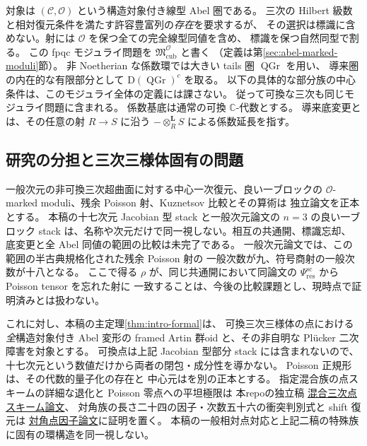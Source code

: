 \documentclass[11pt,a4paper]{ltjsarticle}
\numberwithin{equation}{section}
\newcommand{\C}{\mathbb C}
\begin{document}
対象は $(\mathcal C,\mathcal O)$ という構造対象付き線型 Abel 圏である。
三次の Hilbert 級数と相対復元条件を満たす許容豊富列の\emph{存在}を要求するが、
その選択は標識に含めない。射には $\mathcal O$ を保つ全ての完全線型同値を含め、
標識を保つ自然同型で割る。
この fpqc モジュライ問題を $\mathfrak M^{\mathcal O}_{\mathrm{cub}}$ と書く
（定義は第\ref{sec:abel-marked-moduli}節）。
非 Noetherian な係数環では大きい tails 圏 $\operatorname{QGr}$ を用い、
導来圏の内在的な有限部分として $\mathrm D(\operatorname{QGr})^c$ を取る。
以下の具体的な部分族の中心条件は、このモジュライ全体の定義には課さない。
従って可換な三次も同じモジュライ問題に含まれる。
係数基底は通常の可換 $\C$-代数とする。
導来底変更とは、その任意の射 $R\to S$ に沿う
$-\otimes_R^{\mathbf L}S$ による係数延長を指す。

\subsection{研究の分担と三次三様体固有の問題}
一般次元の非可換三次超曲面に対する中心一次復元、良い一ブロックの
$\mathcal O$-marked moduli、残余 Poisson 射、Kuznetsov 比較とその算術は
独立論文\cite{NCCubicGeneral}を正本とする。
本稿の十七次元 Jacobian 型 stack と一般次元論文の $n=3$ の良い一ブロック stack
は、名称や次元だけで同一視しない。相互の共通開、標識忘却、
底変更と全 Abel 同値の範囲の比較は未完了である。
一般次元論文では、この範囲の半古典規格化された残余 Poisson 射の
一般次数が九、符号商射の一般次数が十八となる。
ここで得る $\rho$ が、同じ共通開において同論文の
$\Psi_{\mathrm{res}}^{\mathrm{sc}}$ から Poisson tensor を忘れた射に
一致することは、今後の比較課題とし、現時点で証明済みとは扱わない。

これに対し、本稿の主定理\ref{thm:intro-formal}は、
可換三次三様体の点における\emph{全}構造対象付き Abel 変形の
framed Artin 群oid と、その非自明な Pl\"ucker 二次障害を対象とする。
可換点は上記 Jacobian 型部分 stack には含まれないので、
十七次元という数値だけから両者の閉包・成分性を導かない。
Poisson 正規形は\cite{PoissonCubic}、その代数的量子化の存在と
中心元は\cite{CubicQuantization}を別の正本とする。
指定混合族の点スキームの詳細な退化と Poisson 零点への平坦極限は
本repoの独立稿
\href{https://github.com/uedakazushi/nc-cubic-threefold/blob/main/papers/mixed-cubic-point-schemes.tex}{混合三次点スキーム論文}、
対角族の長さ二十四の因子・次数五十六の衝突判別式と shift 復元は
\href{https://github.com/uedakazushi/nc-cubic-threefold/blob/main/papers/diagonal-cubic-point-geometry.tex}{対角点因子論文}に証明を置く。
本稿の一般相対点対応と上記二稿の特殊族に固有の環構造を同一視しない。
\end{document}
